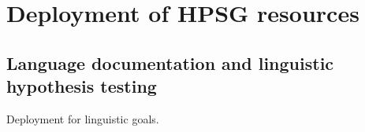 \documentclass[output=paper]{langsci/langscibook}
\begin{document}










\section{Deployment of HPSG resources}
\label{cl:deployment}

\subsection{Language documentation and linguistic hypothesis testing}

Deployment for linguistic goals.
\end{document}

